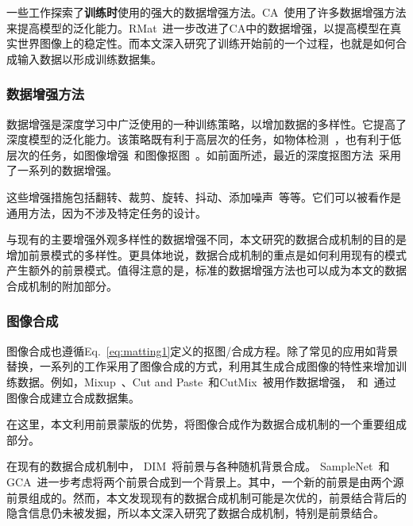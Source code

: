 \documentclass[supercite]{HustGraduPaper}
\begin{document}
	一些工作探索了\textbf{训练时}使用的强大的数据增强方法。CA~\cite{CA}使用了许多数据增强方法来提高模型的泛化能力。RMat~\cite{RMat}进一步改进了CA中的数据增强，以提高模型在真实世界图像上的稳定性。而本文深入研究了训练开始前的一个过程，也就是如何合成输入数据以形成训练数据集。
	
	
	\subsubsection{数据增强方法}
	数据增强是深度学习中广泛使用的一种训练策略，以增加数据的多样性。它提高了深度模型的泛化能力。该策略既有利于高层次的任务，如物体检测~\cite{cutandpaste}，也有利于低层次的任务，如图像增强~\cite{density,uncertainty}和图像抠图~\cite{GCA,A2U}。如前面所述，最近的深度抠图方法~\cite{CA,RMat}采用了一系列的数据增强。
	
	这些增强措施包括翻转、裁剪、旋转、抖动、添加噪声~\cite{cutandpaste,har,improving,synthia}等等。它们可以被看作是通用方法，因为不涉及特定任务的设计。

	与现有的主要增强外观多样性的数据增强不同，本文研究的数据合成机制的目的是增加前景模式的多样性。更具体地说，数据合成机制的重点是如何利用现有的模式产生额外的前景模式。值得注意的是，标准的数据增强方法也可以成为本文的数据合成机制的附加部分。
	
	\subsubsection{图像合成}
	图像合成也遵循Eq.~\eqref{eq:matting1}定义的抠图/合成方程。除了常见的应用如背景替换，一系列的工作采用了图像合成的方式，利用其生成合成图像的特性来增加训练数据。例如，Mixup~\cite{mixup}、Cut and Paste~\cite{cutandpaste}和CutMix~\cite{cutmix}被用作数据增强，~\cite{syndata1}和~\cite{syndata2}通过图像合成建立合成数据集。

	在这里，本文利用前景蒙版的优势，将图像合成作为数据合成机制的一个重要组成部分。

	在现有的数据合成机制中， DIM~\cite{DIM}将前景与各种随机背景合成。 SampleNet~\cite{LBSampling}和GCA~\cite{GCA}进一步考虑将两个前景合成到一个背景上。其中，一个新的前景是由两个源前景组成的。然而，本文发现现有的数据合成机制可能是次优的，前景结合背后的隐含信息仍未被发掘，所以本文深入研究了数据合成机制，特别是前景结合。
\end{document}
